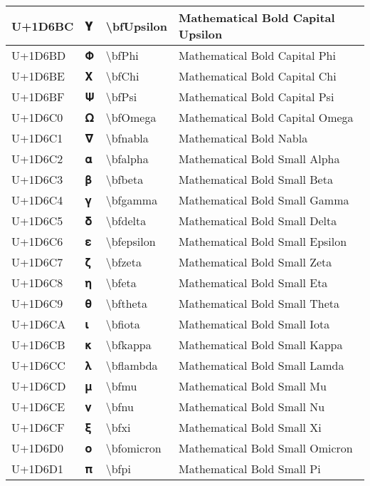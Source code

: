 \begin{table}[h]
\begin{tabulary}{\linewidth}{|L|L|L|L|}
\hline
U+1D6BC & 𝚼 & {\textbackslash}bfUpsilon & Mathematical Bold Capital Upsilon \\
\hline
U+1D6BD & 𝚽 & {\textbackslash}bfPhi & Mathematical Bold Capital Phi \\
\hline
U+1D6BE & 𝚾 & {\textbackslash}bfChi & Mathematical Bold Capital Chi \\
\hline
U+1D6BF & 𝚿 & {\textbackslash}bfPsi & Mathematical Bold Capital Psi \\
\hline
U+1D6C0 & 𝛀 & {\textbackslash}bfOmega & Mathematical Bold Capital Omega \\
\hline
U+1D6C1 & 𝛁 & {\textbackslash}bfnabla & Mathematical Bold Nabla \\
\hline
U+1D6C2 & 𝛂 & {\textbackslash}bfalpha & Mathematical Bold Small Alpha \\
\hline
U+1D6C3 & 𝛃 & {\textbackslash}bfbeta & Mathematical Bold Small Beta \\
\hline
U+1D6C4 & 𝛄 & {\textbackslash}bfgamma & Mathematical Bold Small Gamma \\
\hline
U+1D6C5 & 𝛅 & {\textbackslash}bfdelta & Mathematical Bold Small Delta \\
\hline
U+1D6C6 & 𝛆 & {\textbackslash}bfepsilon & Mathematical Bold Small Epsilon \\
\hline
U+1D6C7 & 𝛇 & {\textbackslash}bfzeta & Mathematical Bold Small Zeta \\
\hline
U+1D6C8 & 𝛈 & {\textbackslash}bfeta & Mathematical Bold Small Eta \\
\hline
U+1D6C9 & 𝛉 & {\textbackslash}bftheta & Mathematical Bold Small Theta \\
\hline
U+1D6CA & 𝛊 & {\textbackslash}bfiota & Mathematical Bold Small Iota \\
\hline
U+1D6CB & 𝛋 & {\textbackslash}bfkappa & Mathematical Bold Small Kappa \\
\hline
U+1D6CC & 𝛌 & {\textbackslash}bflambda & Mathematical Bold Small Lamda \\
\hline
U+1D6CD & 𝛍 & {\textbackslash}bfmu & Mathematical Bold Small Mu \\
\hline
U+1D6CE & 𝛎 & {\textbackslash}bfnu & Mathematical Bold Small Nu \\
\hline
U+1D6CF & 𝛏 & {\textbackslash}bfxi & Mathematical Bold Small Xi \\
\hline
U+1D6D0 & 𝛐 & {\textbackslash}bfomicron & Mathematical Bold Small Omicron \\
\hline
U+1D6D1 & 𝛑 & {\textbackslash}bfpi & Mathematical Bold Small Pi \\

\end{tabulary}
\end{table}
